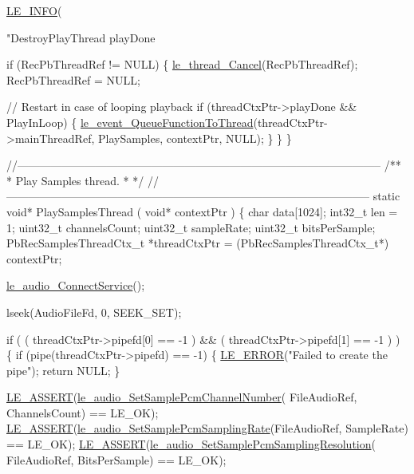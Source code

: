 \begin{DoxyCodeInclude}
{{{{{{{    \hyperlink{le__log_8h_a23e6d206faa64f612045d688cdde5808}{LE\_INFO}(\textcolor{stringliteral}{"DestroyPlayThread playDone %

    \textcolor{keywordflow}{if} (RecPbThreadRef != NULL)
    \{
        \hyperlink{le__thread_8h_a0f1c1b98f354a96e6e31e55a71b58f6a}{le\_thread\_Cancel}(RecPbThreadRef);
        RecPbThreadRef = NULL;

        \textcolor{comment}{// Restart in case of looping playback}
        \textcolor{keywordflow}{if} (threadCtxPtr->playDone && PlayInLoop)
        \{
            \hyperlink{le__event_loop_8h_a228da2d1f53ffa74517f108b0dcfa4d9}{le\_event\_QueueFunctionToThread}(threadCtxPtr->mainThreadRef,
                                           PlaySamples,
                                           contextPtr,
                                           NULL);
        \}
    \}
\}

\textcolor{comment}{//--------------------------------------------------------------------------------------------------}\textcolor{comment}{}
\textcolor{comment}{/**}
\textcolor{comment}{ *  Play Samples thread.}
\textcolor{comment}{ *}
\textcolor{comment}{ */}
\textcolor{comment}{//--------------------------------------------------------------------------------------------------}
\textcolor{keyword}{static} \textcolor{keywordtype}{void}* PlaySamplesThread
(
    \textcolor{keywordtype}{void}* contextPtr
)
\{
    \textcolor{keywordtype}{char} data[1024];
    int32\_t len = 1;
    uint32\_t channelsCount;
    uint32\_t sampleRate;
    uint32\_t bitsPerSample;
    PbRecSamplesThreadCtx\_t *threadCtxPtr = (PbRecSamplesThreadCtx\_t*) contextPtr;

    \hyperlink{le__audio__interface_8h_a65a8844fc6d2e1b7ed78f33bef1b9990}{le\_audio\_ConnectService}();

    lseek(AudioFileFd, 0, SEEK\_SET);

    \textcolor{keywordflow}{if} ( ( threadCtxPtr->pipefd[0] == -1 ) && ( threadCtxPtr->pipefd[1] == -1 ) )
    \{
        \textcolor{keywordflow}{if} (pipe(threadCtxPtr->pipefd) == -1)
        \{
            \hyperlink{le__log_8h_a353590f91b3143a7ba3a416ae5a50c3d}{LE\_ERROR}(\textcolor{stringliteral}{"Failed to create the pipe"});
            \textcolor{keywordflow}{return} NULL;
        \}

        \hyperlink{le__log_8h_ac0dbbef91dc0fed449d0092ff0557b39}{LE\_ASSERT}(\hyperlink{le__audio__interface_8h_aae7db9f0933119fb5a61162722b3274a}{le\_audio\_SetSamplePcmChannelNumber}(
      FileAudioRef, ChannelsCount) == LE\_OK);
        \hyperlink{le__log_8h_ac0dbbef91dc0fed449d0092ff0557b39}{LE\_ASSERT}(\hyperlink{le__audio__interface_8h_a04adfcc0e8f5796eca53c31cd5dd6528}{le\_audio\_SetSamplePcmSamplingRate}(FileAudioRef,
       SampleRate) == LE\_OK);
        \hyperlink{le__log_8h_ac0dbbef91dc0fed449d0092ff0557b39}{LE\_ASSERT}(\hyperlink{le__audio__interface_8h_aae37b46c13f76144dd94c48bfe94998b}{le\_audio\_SetSamplePcmSamplingResolution}(
      FileAudioRef, BitsPerSample) == LE\_OK);

}}}}}}}}
\end{DoxyCodeInclude}
